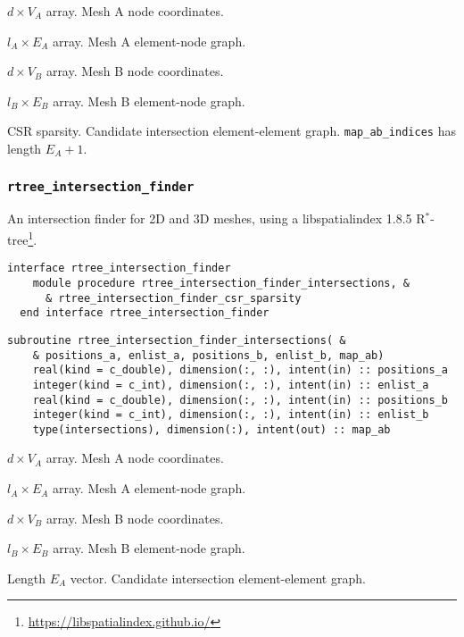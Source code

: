 \documentclass{article}
\begin{document}
\begin{description}[font=\ttfamily\bfseries,leftmargin=2.2\parindent,labelindent=1.7\parindent,noitemsep]
  \item[positions\_a] $d \times V_A$ array. Mesh A node coordinates.
  \item[enlist\_a] $l_A \times E_A$ array. Mesh A element-node graph.
  \item[positions\_b] $d \times V_B$ array. Mesh B node coordinates.
  \item[enlist\_b] $l_B \times E_B$ array. Mesh B element-node graph.
  \item[map\_ab\_indices, map\_ab\_indptr] CSR sparsity. Candidate intersection
    element-element graph. \linebreak \verb+map_ab_indices+ has length
    $E_A + 1$.
\end{description}

\subsubsection{\texttt{rtree\_intersection\_finder}}

An intersection finder for 2D and 3D meshes, using a libspatialindex 1.8.5
R${}^*$-tree\footnote{\url{https://libspatialindex.github.io/}}.

\begin{lstlisting}[language=FORTRAN]
  interface rtree_intersection_finder
    module procedure rtree_intersection_finder_intersections, &
      & rtree_intersection_finder_csr_sparsity
  end interface rtree_intersection_finder
\end{lstlisting}

\begin{lstlisting}[language=FORTRAN]
  subroutine rtree_intersection_finder_intersections( &
    & positions_a, enlist_a, positions_b, enlist_b, map_ab)
    real(kind = c_double), dimension(:, :), intent(in) :: positions_a
    integer(kind = c_int), dimension(:, :), intent(in) :: enlist_a
    real(kind = c_double), dimension(:, :), intent(in) :: positions_b
    integer(kind = c_int), dimension(:, :), intent(in) :: enlist_b
    type(intersections), dimension(:), intent(out) :: map_ab
\end{lstlisting}

\begin{description}[font=\ttfamily\bfseries,leftmargin=2.2\parindent,labelindent=1.7\parindent,noitemsep]
  \item[positions\_a] $d \times V_A$ array. Mesh A node coordinates.
  \item[enlist\_a] $l_A \times E_A$ array. Mesh A element-node graph.
  \item[positions\_b] $d \times V_B$ array. Mesh B node coordinates.
  \item[enlist\_b] $l_B \times E_B$ array. Mesh B element-node graph.
  \item[map\_ab] Length $E_A$ vector. Candidate intersection element-element
    graph.
\end{description}
\end{document}
